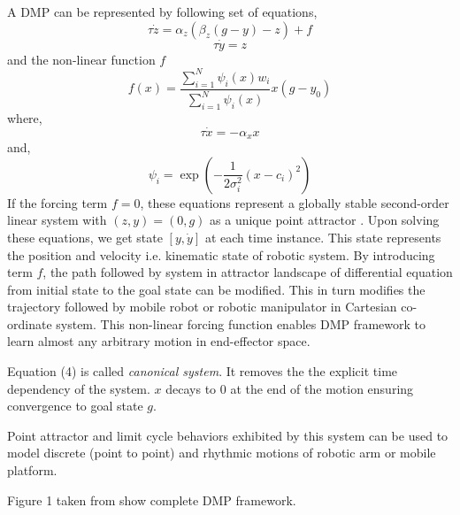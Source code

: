 A DMP can be represented by following set of equations,  
\begin{equation}
\tau\dot{z} = \alpha_{z}(\beta_{z}(g - y) - z) + f
\end{equation}
\begin{equation}
\tau \dot{y} = z
\end{equation}
and the non-linear function $f$
\begin{equation}
f(x) = \frac{\sum_{i=1}^{N}\psi_{i}(x)w_{i}}{\sum_{i=1}^{N}\psi_{i}(x)}x(g - y_{0})
\end{equation}
where,
\begin{equation}
\tau \dot{x} = -\alpha_{x}x
\end{equation}
and,
\begin{equation}
\psi_{i} = \exp(-{\frac{1}{2\sigma_{i}^{2}}(x - c_{i})^{2}})
\end{equation}
If the forcing term $f = 0$, these equations represent a globally stable second-order linear system with $(z, y) = (0, g)$ as a unique point attractor \cite{ijspeert2013dynamical}. Upon solving these equations, we get state $[y,\dot{y}]$ at each time instance. This state represents the position and velocity i.e. kinematic state of robotic system. By introducing term $f$, the path followed by system in attractor landscape of differential equation from initial state to the goal state can be modified. This in turn modifies the trajectory followed by mobile robot or robotic manipulator in Cartesian co-ordinate system. This non-linear forcing function enables DMP framework to learn almost any arbitrary motion in end-effector space. 
\par Equation (4) is called \textit{canonical system}. It removes the the explicit time dependency of the system. $x$ decays to 0 at the end of the motion ensuring convergence to goal state $g$.  
\par Point attractor and limit cycle behaviors exhibited by this system can be used to model discrete (point to point) and rhythmic motions of robotic arm or mobile platform.   
\vspace{0.5cm}




\par Figure 1 taken from \cite{ijspeert2013dynamical} show complete DMP framework. 

